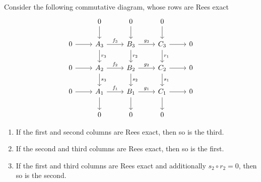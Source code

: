 \begin{corollary}[3x3 lemma]
    Consider the following commutative diagram, whose rows are Rees exact
    \[\begin{tikzcd}
        & 0 & 0 & 0 \\
        0 & {A_3} & {B_3} & {C_3} & 0 \\
        0 & {A_2} & {B_2} & {C_2} & 0 \\
        0 & {A_1} & {B_1} & {C_1} & 0 \\
        & 0 & 0 & 0
        \arrow[from=1-2, to=2-2]
        \arrow[from=1-3, to=2-3]
        \arrow[from=1-4, to=2-4]
        \arrow[from=2-1, to=2-2]
        \arrow["{f_3}", from=2-2, to=2-3]
        \arrow["{r_3}", from=2-2, to=3-2]
        \arrow["{g_3}", from=2-3, to=2-4]
        \arrow["{r_2}", from=2-3, to=3-3]
        \arrow[from=2-4, to=2-5]
        \arrow["{r_1}", from=2-4, to=3-4]
        \arrow[from=3-1, to=3-2]
        \arrow["{f_2}", from=3-2, to=3-3]
        \arrow["{s_3}", from=3-2, to=4-2]
        \arrow["{g_2}", from=3-3, to=3-4]
        \arrow["{s_2}", from=3-3, to=4-3]
        \arrow[from=3-4, to=3-5]
        \arrow["{s_1}", from=3-4, to=4-4]
        \arrow[from=4-1, to=4-2]
        \arrow["{f_1}", from=4-2, to=4-3]
        \arrow[from=4-2, to=5-2]
        \arrow["{g_1}", from=4-3, to=4-4]
        \arrow[from=4-3, to=5-3]
        \arrow[from=4-4, to=4-5]
        \arrow[from=4-4, to=5-4]
    \end{tikzcd}\]
    \begin{enumerate}
        \item If the first and second columns are Rees exact, then so is the third.
        \item If the second and third columns are Rees exact, then so is the first.
        \item If the first and third columns are Rees exact and additionally $s_2\circ r_2=0$, then so is the second.
    \end{enumerate}
\end{corollary}
